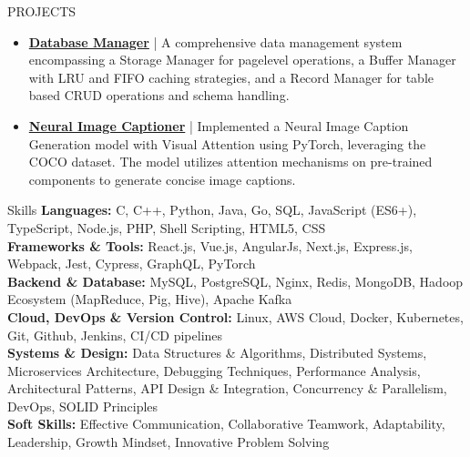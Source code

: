 \documentclass{resume} %
\begin{document}
\vspace{-5pt}
\begin{rSection}{PROJECTS}
   \vspace{0.6em}

   \begin{minipage}[t]{1\textwidth}
      \begin{itemize}[left=0pt, nosep, before=\vspace{-0.5\baselineskip}]
         \item \small \textbf{\href{https://github.com/Prajwal-S-Venkatesh/buffer-manager-c}{Database Manager}} | {A comprehensive data management system encompassing a Storage Manager for page\-level operations, a Buffer Manager with LRU and FIFO caching strategies, and a Record Manager for table based CRUD operations and schema handling.}
         \item \small \textbf{\href{https://github.com/Prajwal-S-Venkatesh/image-captioner}{Neural Image Captioner}} | {Implemented a Neural Image Caption Generation model with Visual Attention using PyTorch, leveraging the COCO dataset. The model utilizes attention mechanisms on pre-trained components to generate concise image captions.}
         \vspace{0.25em}
      \end{itemize}
   \end{minipage}
   
   \end{rSection} 
      
\vspace{-5pt}
\begin{rSection}{Skills}
   \small \textbf{Languages:} C, C++, Python, Java, Go, SQL, JavaScript (ES6+), TypeScript, Node.js, PHP, Shell Scripting, HTML5, CSS \\
   \small \textbf{Frameworks \& Tools:} React.js, Vue.js, AngularJs, Next.js, Express.js, Webpack, Jest, Cypress, GraphQL, PyTorch \\
   \small \textbf{Backend \& Database:} MySQL, PostgreSQL, Nginx, Redis, MongoDB, Hadoop Ecosystem (MapReduce, Pig, Hive), Apache Kafka \\
   \small \textbf{Cloud, DevOps \& Version Control:} Linux, AWS Cloud, Docker, Kubernetes, Git, Github, Jenkins, CI/CD pipelines \\
\textbf{Systems \& Design:} Data Structures \& Algorithms, Distributed Systems, Microservices Architecture, Debugging Techniques, Performance Analysis, Architectural Patterns, API Design \& Integration, Concurrency \& Parallelism, DevOps, SOLID Principles \\
   \small \textbf{Soft Skills:} Effective Communication, Collaborative Teamwork, Adaptability, Leadership, Growth Mindset, Innovative Problem Solving \\
\end{rSection}


\end{document}
